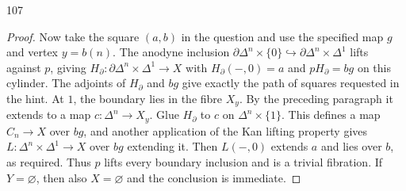 \begin{exercise}{107}
\begin{proof}
Now take the square $(a,b)$ in the question and use the specified map
$g$ and vertex $y=b(n)$.
The anodyne inclusion
$\partial\Delta^n\times\{0\}\hookrightarrow
\partial\Delta^n\times\Delta^1$ lifts against $p$, giving
$H_\partial\colon\partial\Delta^n\times\Delta^1\to X$ with
$H_\partial(-,0)=a$ and $pH_\partial=bg$ on this cylinder.
The adjoints of $H_\partial$ and $bg$ give exactly the path of squares
requested in the hint.
At $1$, the boundary lies in the fibre $X_y$.
By the preceding paragraph it extends to a map
$c\colon\Delta^n\to X_y$.
Glue $H_\partial$ to $c$ on $\Delta^n\times\{1\}$.
This defines a map $C_n\to X$ over $bg$, and another application of
the Kan lifting property gives
$L\colon\Delta^n\times\Delta^1\to X$ over $bg$ extending it.
Then $L(-,0)$ extends $a$ and lies over $b$, as required.
Thus $p$ lifts every boundary inclusion and is a trivial fibration.
If $Y=\varnothing$, then also $X=\varnothing$ and the conclusion is immediate.
\end{proof}
\end{exercise}
